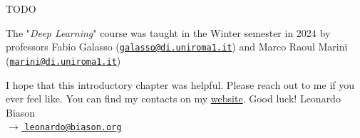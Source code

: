     \begin{thebibliography}{9}
         TODO
    \end{thebibliography}
\endgroup

\begin{tcolorbox}[colback=Dandelion!25, colframe=Dandelion!50]
    \begin{center}
        The "\textit{Deep Learning}" course was taught in the Winter semester in 2024 by professors Fabio Galasso (\href{mailto:galasso@di.uniroma1.it}{\texttt{galasso@di.uniroma1.it}}) and Marco Raoul Marini (\href{mailto:marini@di.uniroma1.it}{\texttt{marini@di.uniroma1.it}})
    \end{center}
\end{tcolorbox}

I hope that this introductory chapter was helpful. Please reach out to me if you ever feel like. You can find my contacts on my \href{https://www.leonardobiason.com}{website}. Good luck! \nl
Leonardo Biason\\
{\footnotesize \href{mailto:leonardo@biason.org}{$\to$ \texttt{leonardo@biason.org}}}
